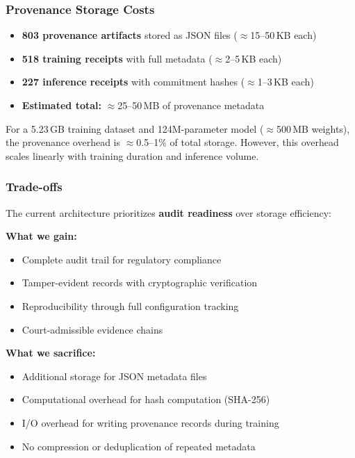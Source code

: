 \documentclass[11pt,a4paper]{article}
\begin{document}
\subsubsection{Provenance Storage Costs}

\begin{itemize}
    \item \textbf{803 provenance artifacts} stored as JSON files ($\approx$15--50\,KB each)
    \item \textbf{518 training receipts} with full metadata ($\approx$2--5\,KB each)
    \item \textbf{227 inference receipts} with commitment hashes ($\approx$1--3\,KB each)
    \item \textbf{Estimated total:} $\approx$25--50\,MB of provenance metadata
\end{itemize}

For a 5.23\,GB training dataset and 124M-parameter model ($\approx$500\,MB weights), the provenance overhead is $\approx$0.5--1\% of total storage. However, this overhead scales linearly with training duration and inference volume.

\subsubsection{Trade-offs}

The current architecture prioritizes \textbf{audit readiness} over storage efficiency:

\textbf{What we gain:}
\begin{itemize}
    \item Complete audit trail for regulatory compliance
    \item Tamper-evident records with cryptographic verification
    \item Reproducibility through full configuration tracking
    \item Court-admissible evidence chains
\end{itemize}

\textbf{What we sacrifice:}
\begin{itemize}
    \item Additional storage for JSON metadata files
    \item Computational overhead for hash computation (SHA-256)
    \item I/O overhead for writing provenance records during training
    \item No compression or deduplication of repeated metadata
\end{itemize}
\end{document}
